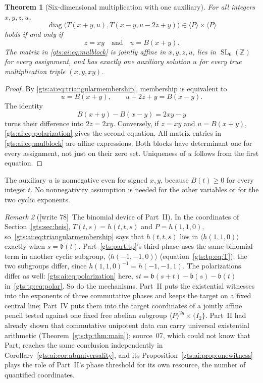 \documentclass[11pt,letterpaper]{article}
\newtheorem{theorem}{Theorem}[section]
\theoremstyle{definition}
\theoremstyle{remark}
\newtheorem{remark}[theorem]{Remark}
\newcommand{\Z}{\mathbb Z}
\newcommand{\SL}{\operatorname{SL}}
\newcommand{\bn}{\mathfrak b}
\newcommand{\diag}{\operatorname{diag}}
\newcommand{\wtagb}{\textup{[write 78]}}
\begin{document}
\begin{theorem}[Six-dimensional multiplication with one auxiliary]\label{gts:ai:thm:mul}
For all integers $x,y,z,u$,
\begin{equation}\label{gts:ai:eq:mulblock}
 \diag\bigl(T(x+y,u),T(x-y,u-2z+y)\bigr)
 \in\langle P\rangle\times\langle P\rangle
\end{equation}
holds if and only if
\[
 z=xy\quad\text{and}\quad u=B(x+y).
\]
The matrix in \eqref{gts:ai:eq:mulblock} is jointly affine in $x,y,z,u$, lies in $\SL_6(\Z)$ for every assignment, and has exactly one auxiliary solution $u$ for every true multiplication triple $(x,y,xy)$.
\end{theorem}
\begin{proof}
By \eqref{gts:ai:eq:triangularmembership}, membership is equivalent to
\[
 u=B(x+y),\qquad u-2z+y=B(x-y).
\]
The identity
\begin{equation}\label{gts:ai:eq:polarization}
 B(x+y)-B(x-y)=2xy-y
\end{equation}
turns their difference into $2z=2xy$. Conversely, if $z=xy$ and $u=B(x+y)$, \eqref{gts:ai:eq:polarization} gives the second equation. All matrix entries in \eqref{gts:ai:eq:mulblock} are affine expressions. Both blocks have determinant one for every assignment, not just on their zero set. Uniqueness of $u$ follows from the first equation.
\end{proof}
The auxiliary $u$ is nonnegative even for signed $x,y$, because $B(t)\ge0$ for every integer $t$. No nonnegativity assumption is needed for the other variables or for the two cyclic exponents.

\begin{remark}[\wtagb\ The binomial device of Part~II]\label{gts:ai:rem:binomial}
In the coordinates of Section~\ref{gts:sec:heis}, $T(t,s)=h(t,t,s)$ and $P=h(1,1,0)$, so~\eqref{gts:ai:eq:triangularmembership} says that $h(t,t,s)$ lies in $\langle h(1,1,0)\rangle$ exactly when $s=\bn(t)$. Part~\ref{gts:part:tp}'s third phase uses the same binomial term in another cyclic subgroup, $\langle h(-1,-1,0)\rangle$ (equation~\eqref{gts:tp:eq:T}); the two subgroups differ, since $h(1,1,0)^{-1}=h(-1,-1,1)$. The polarizations differ as well: \eqref{gts:ai:eq:polarization} here, $st=\bn(s+t)-\bn(s)-\bn(t)$ in~\eqref{gts:tp:eq:polar}. So do the mechanisms. Part~II puts the existential witnesses into the exponents of three commutative phases and keeps the target on a fixed central line; Part~IV puts them into the target coordinates of a jointly affine pencil tested against one fixed free abelian subgroup $\langle P\rangle^{2g}\times\{I_2\}$. Part~II had already shown that commutative unipotent data can carry universal existential arithmetic (Theorem~\ref{gts:tp:thm:main}); source~07, which could not know that Part, reaches the same conclusion independently in Corollary~\ref{gts:ai:cor:abuniversality}, and its Proposition~\ref{gts:ai:prop:onewitness} plays the role of Part~II's phase threshold for its own resource, the number of quantified coordinates.
\end{remark}
\end{document}

